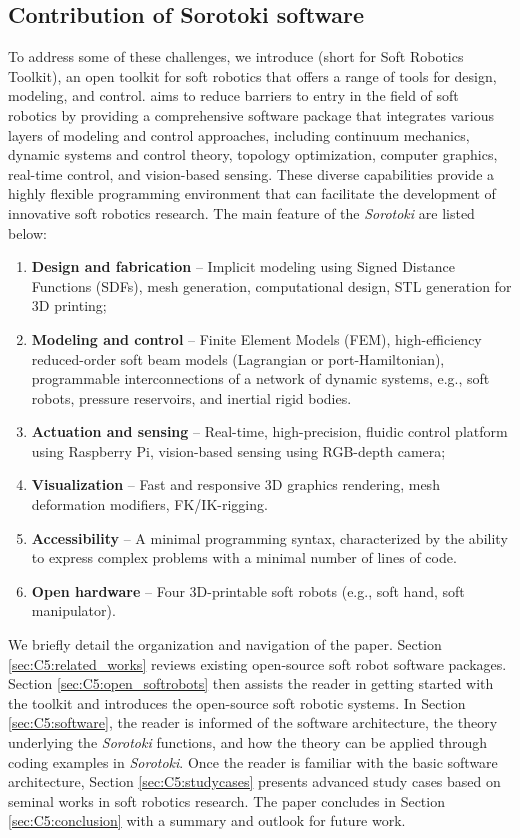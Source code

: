 \subsection{Contribution of Sorotoki software}
To address some of these challenges, we introduce \sorotoki (short for Soft Robotics Toolkit), an open \matlab toolkit for soft robotics that offers a range of tools for design, modeling, and control. \sorotoki aims to reduce barriers to entry in the field of soft robotics by providing a comprehensive software package that integrates various layers of modeling and control approaches, including continuum mechanics, dynamic systems and control theory, topology optimization, computer graphics, real-time control, and vision-based sensing. These diverse capabilities provide a highly flexible programming environment that can facilitate the development of innovative soft robotics research. The main feature of the \textit{Sorotoki} are listed below:
%
\begin{enumerate}
    \setlength\itemsep{-0.1em}
    \item \textbf{Design and fabrication} -- Implicit modeling using Signed Distance Functions (SDFs), mesh generation, computational design, STL generation for 3D printing;
    \item \textbf{Modeling and control} -- Finite Element Models (FEM), high-efficiency reduced-order soft beam models (Lagrangian or port-Hamiltonian), programmable interconnections of a network of dynamic systems, e.g., soft robots, pressure reservoirs, and inertial rigid bodies.
    \item \textbf{Actuation and sensing} -- Real-time, high-precision, fluidic control platform using Raspberry Pi, vision-based sensing using RGB-depth camera;
    \item \textbf{Visualization} -- Fast and responsive 3D graphics rendering, mesh deformation modifiers, FK/IK-rigging.
    \item \textbf{Accessibility} -- A minimal programming syntax, characterized by the ability to express complex problems with a minimal number of lines of code.
    \item \textbf{Open hardware} -- Four 3D-printable soft robots (e.g., soft hand, soft manipulator).
\end{enumerate}
%

We briefly detail the organization and navigation of the paper. Section \ref{sec:C5:related_works} reviews existing open-source soft robot software packages. Section \ref{sec:C5:open_softrobots} then assists the reader in getting started with the toolkit and introduces the open-source soft robotic systems. In Section \ref{sec:C5:software}, the reader is informed of the software architecture, the theory underlying the \textit{Sorotoki} functions, and how the theory can be applied through coding examples in \textit{Sorotoki}. Once the reader is familiar with the basic software architecture, Section \ref{sec:C5:studycases} presents advanced study cases based on seminal works in soft robotics research. The paper concludes in Section \ref{sec:C5:conclusion} with a summary and outlook for future work.
